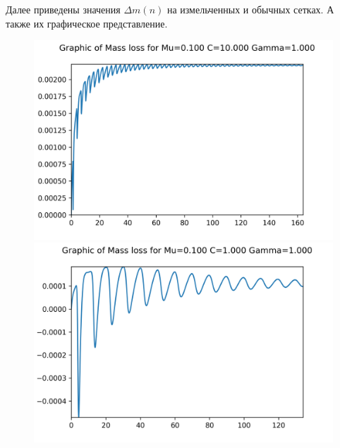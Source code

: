 \newpage
Далее приведены значения $\Delta m(n)$ на измельченных и обычных сетках. А также их графическое представление.






\newpage



\newpage
\begin{figure}[H]
	\centering
	\includegraphics[scale=0.65]{../graphs_data_nonsmooth_1/mass/Graph_mass_mu0.100_C10.000_gamma1.000.png}
	\includegraphics[scale=0.65]{../graphs_data_nonsmooth_1/mass/Graph_mass_mu0.100_C1.000_gamma1.000.png}	

\end{figure}
